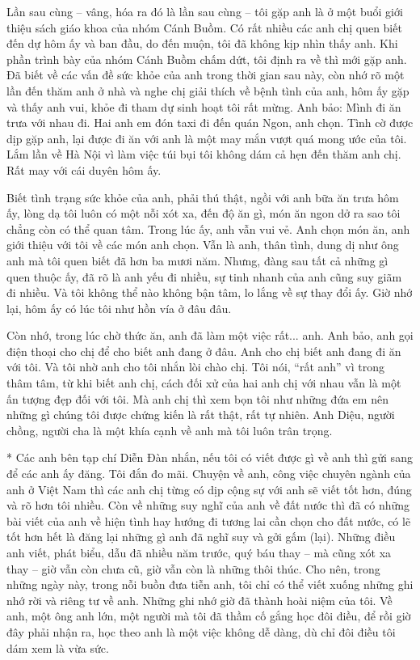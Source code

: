 Lần sau cùng -- vâng, hóa ra đó là lần sau cùng -- tôi gặp anh là ở một buổi giới thiệu sách giáo khoa của nhóm Cánh Buồm. Có rất nhiều các anh chị quen biết đến dự hôm ấy và ban đầu, do đến muộn, tôi đã không kịp nhìn thấy anh. Khi phần trình bày của nhóm Cánh Buồm chấm dứt, tôi định ra về thì mới gặp anh. Đã biết về các vấn đề sức khỏe của anh trong thời gian sau này, còn nhớ rõ một lần đến thăm anh ở nhà và nghe chị giải thích về bệnh tình của anh, hôm ấy gặp và thấy anh vui, khỏe đi tham dự sinh hoạt tôi rất mừng. Anh bảo: Mình đi ăn trưa với nhau đi. Hai anh em đón taxi đi đến quán Ngon, anh chọn. Tình cờ được dịp gặp anh, lại được đi ăn với anh là một may mắn vượt quá mong ước của tôi. Lắm lần về Hà Nội vì làm việc túi bụi tôi không dám cả hẹn đến thăm anh chị. Rất may với cái duyên hôm ấy.

Biết tình trạng sức khỏe của anh, phải thú thật, ngồi với anh bữa ăn trưa hôm ấy, lòng dạ tôi luôn có một nỗi xót xa, đến độ ăn gì, món ăn ngon dở ra sao tôi chẳng còn có thể quan tâm. Trong lúc ấy, anh vẫn vui vẻ. Anh chọn món ăn, anh giới thiệu với tôi về các món anh chọn. Vẫn là anh, thân tình, dung dị như ông anh mà tôi quen biết đã hơn ba mươi năm. Nhưng, đàng sau tất cả những gì quen thuộc ấy, đã rõ là anh yếu đi nhiều, sự tinh nhanh của anh cũng suy giãm đi nhiều. Và tôi không thể nào không bận tâm, lo lắng về sự thay đổi ấy. Giờ nhớ lại, hôm ấy có lúc tôi như hồn vía ở đâu đâu.

Còn nhớ, trong lúc chờ thức ăn, anh đã làm một việc rất... anh. Anh bảo, anh gọi điện thoại cho chị để cho biết anh đang ở đâu. Anh cho chị biết anh đang đi ăn với tôi. Và tôi nhờ anh cho tôi nhắn lòi chào chị. Tôi nói, “rất anh” vì trong thâm tâm, từ khi biết anh chị, cách đối xử của hai anh chị với nhau vẫn là một ấn tượng đẹp đối với tôi. Mà anh chị thì xem bọn tôi như những đứa em nên những gì chúng tôi được chứng kiến là rất thật, rất tự nhiên. Anh Diệu, người chồng, người cha là một khía cạnh về anh mà tôi luôn trân trọng.

*
Các anh bên tạp chí Diễn Đàn nhắn, nếu tôi có viết được gì về anh thì gửi sang để các anh ấy đăng. Tôi đắn đo mãi. Chuyện về anh, công việc chuyên ngành của anh ở Việt Nam thì các anh chị từng có dịp cộng sự với anh sẽ viết tốt hơn, đúng và rõ hơn tôi nhiều. Còn về những suy nghĩ của anh về đất nước thì đã có những bài viết của anh về hiện tình hay hướng đi tương lai cần chọn cho đất nước, có lẽ tốt hơn hết là đăng lại những gì anh đã nghĩ suy và gởi gấm (lại). Những điều anh viết, phát biểu, dẫu đã nhiều năm trước, quý báu thay -- mà cũng xót xa thay -- giờ vẫn còn chưa cũ, giờ vẫn còn là những thôi thúc. Cho nên, trong những ngày này, trong nỗi buồn đưa tiễn anh, tôi chỉ có thể viết xuống những ghi nhớ rời và riêng tư về anh. Những ghi nhớ giờ đã thành hoài niệm của tôi. Về anh, một ông anh lớn, một người mà tôi đã thầm cố gắng học đôi điều, để rồi giờ đây phải nhận ra, học theo anh là một việc không dễ dàng, dù chỉ đôi điều tôi dám xem là vừa sức.

